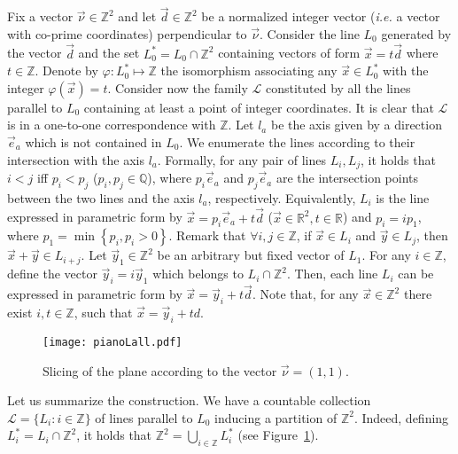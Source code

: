 \documentclass{llncs}
\makeatletter
\newcommand{\z}{\ensuremath{\mathbb{Z}}\xspace}
\newcommand{\ie}{\emph{i.e.}\@\xspace}
\newcommand{\re}{\mathbb{R}}
\newcommand{\q}{\mathbb{Q}}
\newcommand{\zdu}{\ensuremath{\mathbb{Z}^2}\xspace}
\newcommand{\set}[1]{\left\{#1\right\}}
\newcommand{\lzs}{L_0^*}
\newcommand{\nn}{\vec\nu}
\newcommand{\xx}{\vec x}
\newcommand{\yy}{\vec y}
\newcommand{\dd}{\vec d}
\makeatother
\begin{document}
Fix a vector $\nn\in\zdu$ and let $\dd\in\zdu$ be a normalized
integer vector (\ie a vector with co-prime coordinates)
perpendicular to $\nn$. Consider the line $L_0$ generated by the
vector $\dd$ and the set $\lzs=L_0\cap \zdu$ containing vectors of
form $\xx= t\vec d$ where $t\in\z$. Denote by
$\varphi:\lzs\mapsto\z$ the isomorphism associating any
$\xx\in\lzs$ with the integer $\varphi(\xx)= t$. Consider now the
family $\mathcal{L}$ constituted by all the lines parallel to
$L_0$ containing at least a point of integer coordinates.
It is clear that $\mathcal{L}$ is in a one-to-one correspondence
with $\z$. Let $l_a$ be the axis given by a direction ${\vec e}_a$
which is not contained in $L_0$. We enumerate the lines according
to their intersection with the axis $l_a$. Formally, for any pair
of lines $L_i, L_j$, it holds that $i<j$ iff $p_i<p_j$
($p_i,p_j\in\q$), where $p_i{\vec e_a}$ and $p_j{\vec e_a}$
 are the intersection points between the two lines
and the axis $l_a$, respectively. Equivalently, $L_i$ is the line
expressed in parametric form by $\xx=p_i\vec e_a+t\dd$
($\xx\in\re^2, t\in\re$) and $p_i=ip_1$, where $p_1=\min\set{p_i,
p_i>0}$. Remark that $\forall i,j\in\z$, if $\xx\in L_i$ and
$\yy\in L_j$, then $\xx+\yy\in L_{i+j}$. Let $\yy_1\in \zdu$ be an
arbitrary but fixed vector of $L_1$. For any $i\in\z$, define the
vector $\yy_i=i\yy_1$ which belongs to $L_i\cap \zdu$. Then, each
line $L_i$ can be expressed in parametric form by
$\xx=\yy_i+t\dd$. Note that, for any $\xx\in \zdu$ there exist
$i,t\in\z$, such that $\xx=\yy_i+ td$.
\begin{figure}[!htb]
  \begin{center}
     \texttt{[image: pianoLall.pdf]}
   \end{center}
   \caption{Slicing of the plane according to the vector $\nn=(1,1)$.}
 \label{fig:slicing-plane}
\end{figure}
Let us summarize the construction. We have a countable collection
${\mathcal{L}}=\{L_i: i\in\z\}$ of lines parallel to $L_0$
inducing a partition of $\zdu$. Indeed, defining
$L^*_i=L_i\cap\zdu$, it holds that $\zdu=\bigcup_{i\in\z} L_i^*$
(see Figure~\ref{fig:slicing-plane}).
\end{document}
